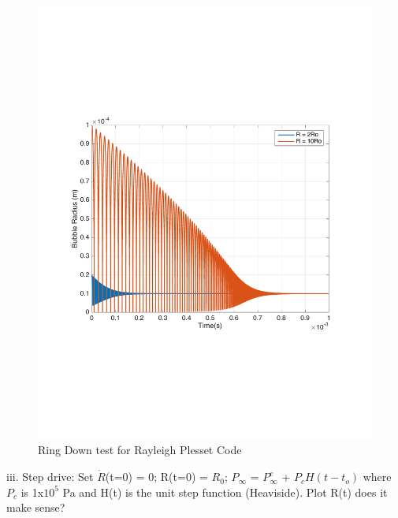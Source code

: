 \documentclass[12pt]{article}
\begin{document}
\begin{enumerate}
\begin{figure}[h]
\includegraphics[scale = 0.4]{ring_down}
\centering
\caption{Ring Down test for Rayleigh Plesset Code}
\end{figure}

iii. Step drive: Set $\dot{R}$(t=0) = 0; R(t=0) = $R_0$; $P_{\infty}$ = $P^e_\infty$ + $P_cH(t-t_o)$ where $P_c$ is 1x$10^5$ Pa and H(t) is the unit step function (Heaviside). Plot R(t) does it make sense? 


\end{enumerate}
\end{document}
